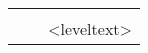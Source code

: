 
\begin{tabularx}{\textwidth}{SXS}
    	& 	& \\
    \mbox{}	& 	& <leveltext>
\end{tabularx}

\centering{\rule{\textwidth}{0.7pt}}\\[1mm]
